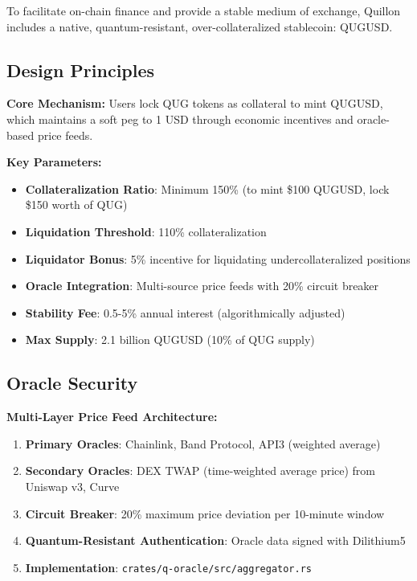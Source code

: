 \documentclass[11pt,a4paper]{scrartcl}
\begin{document}
To facilitate on-chain finance and provide a stable medium of exchange, Quillon includes a native, quantum-resistant, over-collateralized stablecoin: QUGUSD.

\subsection{Design Principles}

\textbf{Core Mechanism:} Users lock QUG tokens as collateral to mint QUGUSD, which maintains a soft peg to 1 USD through economic incentives and oracle-based price feeds.

\textbf{Key Parameters:}

\begin{itemize}
\item \textbf{Collateralization Ratio}: Minimum 150\% (to mint \$100 QUGUSD, lock \$150 worth of QUG)
\item \textbf{Liquidation Threshold}: 110\% collateralization
\item \textbf{Liquidator Bonus}: 5\% incentive for liquidating undercollateralized positions
\item \textbf{Oracle Integration}: Multi-source price feeds with 20\% circuit breaker
\item \textbf{Stability Fee}: 0.5-5\% annual interest (algorithmically adjusted)
\item \textbf{Max Supply}: 2.1 billion QUGUSD (10\% of QUG supply)
\end{itemize}

\subsection{Oracle Security}

\textbf{Multi-Layer Price Feed Architecture:}

\begin{enumerate}
\item \textbf{Primary Oracles}: Chainlink, Band Protocol, API3 (weighted average)
\item \textbf{Secondary Oracles}: DEX TWAP (time-weighted average price) from Uniswap v3, Curve
\item \textbf{Circuit Breaker}: 20\% maximum price deviation per 10-minute window
\item \textbf{Quantum-Resistant Authentication}: Oracle data signed with Dilithium5
\item \textbf{Implementation}: \texttt{crates/q-oracle/src/aggregator.rs}
\end{enumerate}
\end{document}

